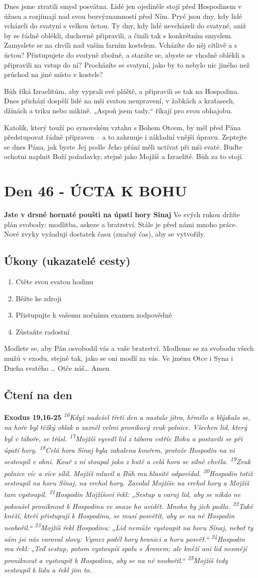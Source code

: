 \documentclass[11pt]{article}
\newcommand{\zacatekSedmyTyden}{
  \textbf{Jste v drsné hornaté poušti na úpatí hory Sinaj} \newline 
  Ve svých rukou držíte plán svobody: modlitba, askeze a bratrství. Stále je před námi mnoho práce. Nové zvyky vyžadují dostatek času (značný čas), aby se vytvořily.

  \subsection*{Úkony (ukazatelé cesty)}
\begin{enumerate}
  \item Ctěte svou svatou hodinu
  \item Běžte ke zdroji
  \item Přistupujte k vašemu nočnímu examen zodpovědně
  \item Zůstaňte radostní
\end{enumerate}
Modlete se, aby Pán osvobodil vás a vaše bratrství. \newline
Modleme se za svobodu všech mužů v exodu, stejně tak, jako se oni modlí za vás.\newline
Ve jménu Otce i Syna i Ducha svatého …  Otče náš… Amen
}
\begin{document}
Dnes jsme ztratili smysl posvátna. Lidé jen ojediněle stojí před Hospodinem v úžasu a rozjímají nad svou
bezvýznamností před Ním. Pryč jsou dny, kdy lidé vcházeli do svatyní s velkou úctou. Ty dny, kdy lidé nevcházeli do
svatyně, aniž by se řádně oblékli, duchovně připravili, a činili tak s konkrétním smyslem. Zamyslete se na chvíli nad
vaším farním kostelem. Vcházíte do něj citlivě a s úctou? Přistupujete do svatyně zbožně, a staráte se, abyste se vhodně
oblékli a připravili na vstup do ní? Procházíte se svatyní, jako by to nebylo nic jiného než průchod na jiné místo v kostele?

Bůh říká Izraelitům, aby vyprali své pláště, a připravili se tak na Hospodina. Dnes přichází dospělí lidé na mši svatou
neupravení, v žabkách a kraťasech, džínách a triku nebo mikině. „Aspoň jsem tady,“ říkají pro svou obhajobu.

Katolík, který touží po synovském vztahu s Bohem Otcem, by měl před Pána předstupovat řádně připraven – a to zahrnuje
i základní vnější úpravu. Zeptejte se dnes Pána, jak byste Jej podle Jeho přání měli uctívat při mši svaté. Buďte ochotni
naplnit Boží požadavky, stejně jako Mojžíš a Izraelité. Bůh za to stojí.


\newpage
\section{Den 46 - ÚCTA K BOHU}
\zacatekSedmyTyden
\subsection*{Čtení na den}
\textbf{Exodus 19,16-25}
\newline
\textit{
\textsuperscript{16}Když nadešel třetí den a nastalo jitro, hřmělo a blýskalo se, na hoře byl těžký oblak a zazněl velmi pronikavý zvuk polnice. Všechen lid, který byl v táboře, se třásl.
\textsuperscript{17}Mojžíš vyvedl lid z tábora vstříc Bohu a postavili se při úpatí hory.
\textsuperscript{18}Celá hora Sínaj byla zahalena kouřem, protože Hospodin na ni sestoupil v ohni. Kouř z ní stoupal jako z hutě a celá hora se silně chvěla.
\textsuperscript{19}Zvuk polnice víc a více sílil. Mojžíš mluvil a Bůh mu hlasitě odpovídal.
\textsuperscript{20}Hospodin totiž sestoupil na horu Sínaj, na vrchol hory. Zavolal Mojžíše na vrchol hory a Mojžíš tam vystoupil.
\textsuperscript{21}Hospodin Mojžíšovi řekl: „Sestup a varuj lid, aby se nikdo ne pokoušel proniknout k Hospodinu ve snaze ho uvidět. Mnoho by jich padlo.
\textsuperscript{22}Také kněží, kteří přistupují k Hospodinu, se musí posvětit, aby se na ně Hospodin neobořil.“
\textsuperscript{23}Mojžíš řekl Hospodinu: „Lid nemůže vystoupit na horu Sínaj, neboť ty sám jsi nás varoval slovy: Vymez podél hory hranici a horu posvěť.“
\textsuperscript{24}Hospodin mu řekl: „Teď sestup, potom vystoupíš spolu s Áronem; ale kněží ani lid nesmějí proniknout a vystoupit k Hospodinu, aby se na ně neobořil.“
\textsuperscript{25}Mojžíš tedy sestoupil k lidu a řekl jim to.
}
\end{document}
